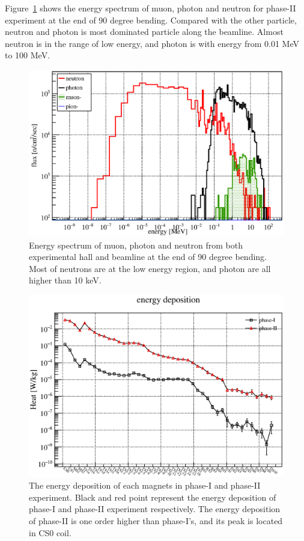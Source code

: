 Figure~\ref{2bending} shows the energy spectrum of muon, photon and neutron for phase-II experiment at the end of 90 degree bending.
Compared with the other particle, neutron and photon is most dominated particle along the beamline.
Almost neutron is in the range of low energy, and photon is with energy from 0.01 MeV to 100 MeV.
  \begin{figure}[H]
   \centering
   \includegraphics[scale=0.43]{chapter3/fig/Neutron.eps}
   \caption{Energy spectrum of muon, photon and neutron from both experimental hall and beamline at the end of 90 degree bending. Most of neutrons are at the low energy region, and photon are all higher than 10 keV.}
   \label{2bending}
  \end{figure}
  \begin{figure}[H]
   \centering
   \includegraphics[scale=0.43]{chapter3/fig/heat.eps}
   \caption{The energy deposition of each magnets in phase-I and phase-II experiment. Black and red point represent the energy deposition of phase-I and phase-II experiment respectively. The energy deposition of phase-II is one order higher than phase-I's, and its peak is located in CS0 coil.}
   \label{2heat}
  \end{figure}
